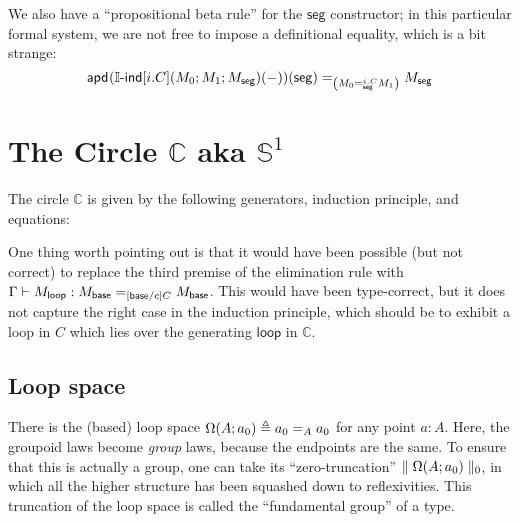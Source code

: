 \documentclass{article}
\newcommand\Interval{\mathbb{I}}
\newcommand\IIndOp{\Interval\textsf{-ind}}
\newcommand\IInd[5]{\IIndOp\Squares*{#1}\Parens*{#2;#3;#4}\Parens*{#5}}
\newcommand\Seg{\mathsf{seg}}
\newcommand\Circle{\mathbb{C}}
\newcommand\Base{\mathsf{base}}
\newcommand\Loop{\mathsf{loop}}
\newcommand\CIndOp{\Circle\textsf{-ind}}
\newcommand\CInd[4]{\CIndOp\Squares{#1}\Parens*{#2;#3}\Parens{#4}}
\DeclarePairedDelimiter\Parens{\lparen}{\rparen}
\DeclarePairedDelimiter\Squares{[}{]}
\begin{document}
We also have a ``propositional beta rule'' for the $\Seg$ constructor;
in this particular formal system, we are not free to impose a
definitional equality, which is a bit strange:
\[
  \Ideq{
    \Parens*{\DIdeq{i.C}{\Seg}{M_0}{M_1}}
  }{
    \hapd{}{
      \IInd{i.C}{M_0}{M_1}{M_\Seg}{-}
    }\Parens*{\Seg}
  }{
    M_\Seg
  }
\]

\section{The Circle $\Circle$ aka $\mathbb{S}^1$}

The circle $\Circle$ is given by the following generators, induction
principle, and equations:
%

One thing worth pointing out is that it would have been possible (but
not correct) to replace the third premise of the elimination rule with
$\hasEF{\Gamma}{M_\Loop}{\Ideq{\subst{\Base}{c}{C}}{M_\Base}{M_\Base}}$. This
would have been type-correct, but it does not capture the right case
in the induction principle, which should be to exhibit a loop in $C$
which lies over the generating $\Loop$ in $\Circle$.

\subsection{Loop space}

There is the (based) loop space
$\Omega\Parens*{A;a_0}\triangleq\Ideq{A}{a_0}{a_0}$ for any point
$a:A$. Here, the groupoid laws become \emph{group} laws, because the
endpoints are the same. To ensure that this is actually a group, one
can take its ``zero-truncation''
$\parallel\Omega\Parens*{A;a_0}\parallel_0$, in which all the higher
structure has been squashed down to reflexivities. This truncation of
the loop space is called the ``fundamental group'' of a type.
\end{document}
